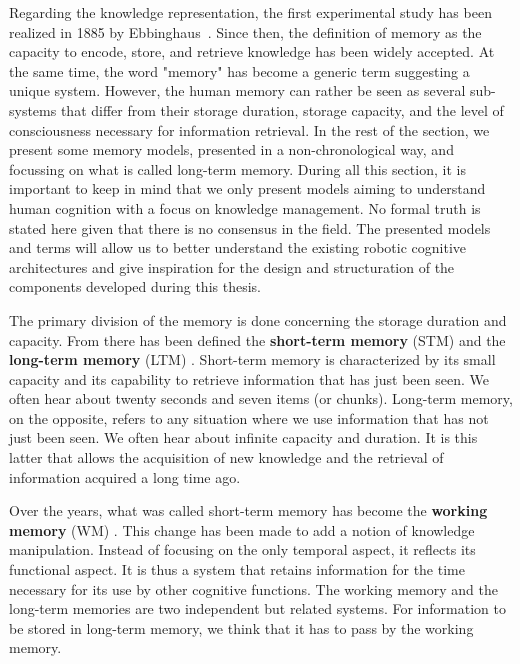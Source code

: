Regarding the knowledge representation, the first experimental study has been realized in 1885 by Ebbinghaus~\cite{ebbinghaus_1885_gedachtnis}. Since then, the definition of memory as the capacity to encode, store, and retrieve knowledge \cite{roediger_1996_retrieval} has been widely accepted. At the same time, the word "memory" has become a generic term suggesting a unique system. However, the human memory can rather be seen as several sub-systems that differ from their storage duration, storage capacity, and the level of consciousness necessary for information retrieval. In the rest of the section, we present some memory models, presented in a non-chronological way, and focussing on what is called long-term memory. During all this section, it is important to keep in mind that we only present models aiming to understand human cognition with a focus on knowledge management. No formal truth is stated here given that there is no consensus in the field. The presented models and terms will allow us to better understand the existing robotic cognitive architectures and give inspiration for the design and structuration of the components developed during this thesis.

The primary division of the memory is done concerning the storage duration and capacity. From there has been defined the \textbf{short-term memory} (STM) and the \textbf{long-term memory} (LTM) \cite{atkinson_1966_some}. Short-term memory is characterized by its small capacity and its capability to retrieve information that has just been seen. We often hear about twenty seconds and seven items (or chunks). Long-term memory, on the opposite, refers to any situation where we use information that has not just been seen. We often hear about infinite capacity and duration. It is this latter that allows the acquisition of new knowledge and the retrieval of information acquired a long time ago.

Over the years, what was called short-term memory has become the \textbf{working memory} (WM) \cite{baddeley_1986_dementia}. This change has been made to add a notion of knowledge manipulation. Instead of focusing on the only temporal aspect, it reflects its functional aspect. It is thus a system that retains information for the time necessary for its use by other cognitive functions. The working memory and the long-term memories are two independent but related systems. For information to be stored in long-term memory, we think that it has to pass by the working memory.

